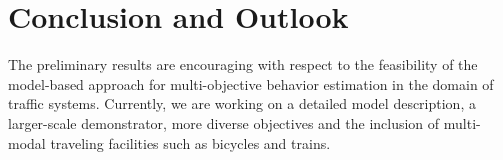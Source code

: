 \documentclass[conference]{../cls/IEEEtran}
\begin{document}
\section{Conclusion and Outlook}

The preliminary results are encouraging with respect to the feasibility of the model-based approach for multi-objective behavior estimation in the domain of traffic systems. Currently, we are working on a detailed model description, a larger-scale demonstrator, more diverse objectives and the inclusion of multi-modal traveling facilities such as bicycles and trains.



\end{document}
